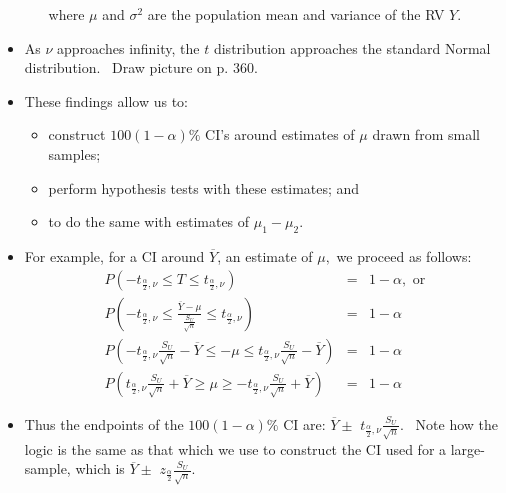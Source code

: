 \documentclass[11pt]{article}
\begin{document}
\begin{itemize}
\begin{itemize}
where $\mu $ and $\sigma ^{2}$ are the population mean and variance of the
RV $Y$.
\end{itemize}

\item As $\nu $ approaches infinity, the $t$ distribution approaches the
standard Normal distribution. \ Draw picture on p. 360.

\item These findings allow us to:

\begin{itemize}
\item construct $100(1-\alpha )\%$ CI's around estimates of $\mu $ drawn
from small samples;

\item perform hypothesis tests with these estimates; and

\item to do the same with estimates of $\mu _{1}-\mu _{2}.$
\end{itemize}

\item For example, for a CI around $\overline{Y}$, an estimate of $\mu ,$ we
proceed as follows: 
\begin{eqnarray*}
P\left( -t_{\frac{\alpha }{2},\nu }\leq T\leq t_{\frac{\alpha }{2},\nu
}\right) &=&1-\alpha ,\text{ or} \\
P\left( -t_{\frac{\alpha }{2},\nu }\leq \frac{\overline{Y}-\mu }{\frac{S_{U}%
}{\sqrt{n}}}\leq t_{\frac{\alpha }{2},\nu }\right) &=&1-\alpha \\
P\left( -t_{\frac{\alpha }{2},\nu }\frac{S_{U}}{\sqrt{n}}-\overline{Y}\leq
-\mu \leq t_{\frac{\alpha }{2},\nu }\frac{S_{U}}{\sqrt{n}}-\overline{Y}%
\right) &=&1-\alpha \\
P\left( t_{\frac{\alpha }{2},\nu }\frac{S_{U}}{\sqrt{n}}+\overline{Y}\geq
\mu \geq -t_{\frac{\alpha }{2},\nu }\frac{S_{U}}{\sqrt{n}}+\overline{Y}%
\right) &=&1-\alpha
\end{eqnarray*}

\item Thus the endpoints of the $100(1-\alpha )\%$ CI are: $\overline{Y}\pm $
$t_{\frac{\alpha }{2},\nu }\frac{S_{U}}{\sqrt{n}}$. \ Note how the logic is
the same as that which we use to construct the CI used for a large-sample,
which is $\overline{Y}\pm $ $z_{\frac{\alpha }{2}}\frac{S_{U}}{\sqrt{n}}.$ \ 


\end{itemize}
\end{document}

